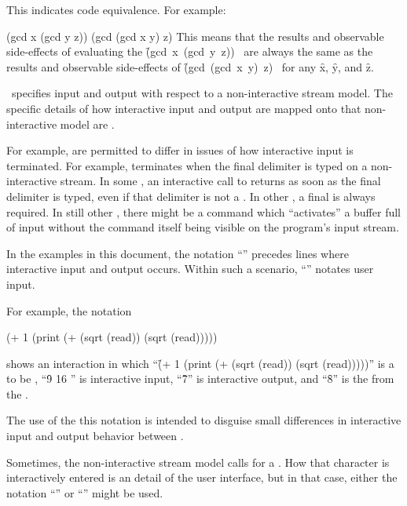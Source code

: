 \itemitem{\EQ} 

This indicates code equivalence. For example:

\code
 (gcd x (gcd y z)) \EQ (gcd (gcd x y) z)
\endcode
This means that the results and observable side-effects of evaluating
the 
\hbox{\f{(gcd x (gcd y z))} } are always the same as the results
and observable side-effects of
\hbox{\f{(gcd (gcd x y) z)} } for any 
\f{x}, \f{y}, and \f{z}.
                      

\itemitem{{\OUT}}

\clisp\ specifies input and output with respect to a non-interactive stream model.
The specific details of how interactive input and output are mapped onto that
non-interactive model are .

For example,  are permitted to differ in issues 
of how interactive input is terminated.  For example, 
terminates when the final delimiter is typed on a non-interactive stream.
In some , an interactive call to  returns
as soon as the final delimiter is typed, even if that delimiter is not a .
In other , a final  is always required.
In still other , there might be a command which ``activates''
a buffer full of input without the command itself being visible on the program's
input stream.

In the examples in this document, the notation ``{\OUT}'' precedes 
lines where interactive input and output occurs.  Within such a scenario,
``'' notates user input.

For example, the notation

\code
 (+ 1 (print (+ (sqrt (read)) (sqrt (read)))))
\OUT {}
\endcode

shows an interaction in which
  ``\f{(+ 1 (print (+ (sqrt (read)) (sqrt (read)))))}''
    is a  to be ,
  ``\f{9 16 }'' is interactive input,
  ``\f{7}'' is interactive output, and 
  ``\f{8}'' is the   from the .

The use of the this notation is intended to disguise small differences 
in interactive input and output behavior between .

Sometimes, the non-interactive stream model calls for a .
How that  character is interactively entered is an 
 detail of the user interface, but in that
case, either the notation ``\NewlineChar'' or ``\CRLF'' might be used.

